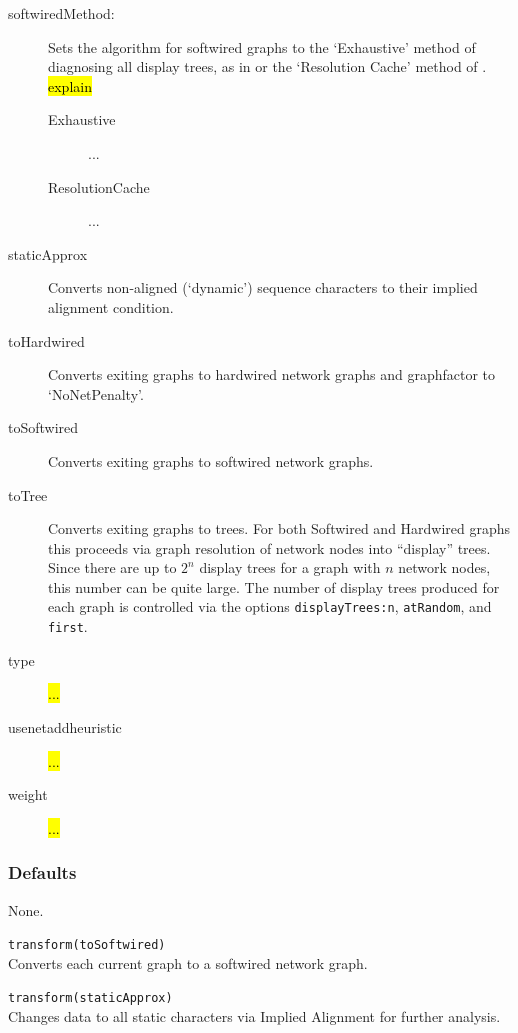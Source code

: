 \begin{description}
		 \item[softwiredMethod:] Sets the algorithm for softwired graphs to the 
		 `Exhaustive' method of diagnosing all display trees, as in \cite{Wheeler2015} or
		 the `Resolution Cache' method of \cite{WheelerandWashburn2023}.
		 \hl{explain}  
				
			\begin{description}
			\item[Exhaustive] ...	
			
			\item[ResolutionCache] ...	
			
			\end{description}
			
		\item[staticApprox] Converts non-aligned (`dynamic') sequence characters to their implied 
		alignment \citep{Wheeler2003, WashburnandWheeler2020} condition.
			
		\item[toHardwired] Converts exiting graphs to hardwired network graphs and graphfactor to `NoNetPenalty'.
			
		\item[toSoftwired] Converts exiting graphs to softwired network graphs.
			
		\item[toTree] Converts exiting graphs to trees. For both Softwired and Hardwired graphs 
		this proceeds via graph resolution of network nodes into ``display'' trees. Since there are up to 
		$2^n$ display trees for a graph with $n$ network nodes, this number can be quite large. 
		The number of display trees produced for each graph is controlled via the options 
		\texttt{displayTrees:n}, \texttt{atRandom}, and \texttt{first}. 
		
		\item[type] \hl{...}
		
		\item[usenetaddheuristic] \hl{...}
		
		\item[weight] \hl{...}
	\end{description}
			
	\subsubsection{Defaults}
		None.
		
	\begin{example}
		\item{\texttt{transform(toSoftwired)}\\Converts each current graph to a softwired network graph.}
					
		\item{\texttt{transform(staticApprox)}\\Changes data to all static characters via Implied Alignment 
		for further analysis.}			
	\end{example}
	
